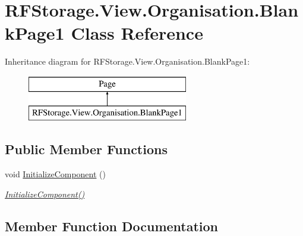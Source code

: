 \hypertarget{class_r_f_storage_1_1_view_1_1_organisation_1_1_blank_page1}{}\section{R\+F\+Storage.\+View.\+Organisation.\+Blank\+Page1 Class Reference}
\label{class_r_f_storage_1_1_view_1_1_organisation_1_1_blank_page1}
Inheritance diagram for R\+F\+Storage.\+View.\+Organisation.\+Blank\+Page1\+:\begin{figure}[H]
\begin{center}
\leavevmode
\includegraphics[height=2.000000cm]{class_r_f_storage_1_1_view_1_1_organisation_1_1_blank_page1}
\end{center}
\end{figure}
\subsection*{Public Member Functions}
\begin{DoxyCompactItemize}
\item 
void \mbox{\hyperlink{class_r_f_storage_1_1_view_1_1_organisation_1_1_blank_page1_a5d36a6a7db0934fa3d5009d94a170dfd}{Initialize\+Component}} ()
\begin{DoxyCompactList}\small\item\em \mbox{\hyperlink{class_r_f_storage_1_1_view_1_1_organisation_1_1_blank_page1_a5d36a6a7db0934fa3d5009d94a170dfd}{Initialize\+Component()}} \end{DoxyCompactList}\end{DoxyCompactItemize}


\subsection{Member Function Documentation}
\mbox{\label{class_r_f_storage_1_1_view_1_1_organisation_1_1_blank_page1_a5d36a6a7db0934fa3d5009d94a170dfd}} 

